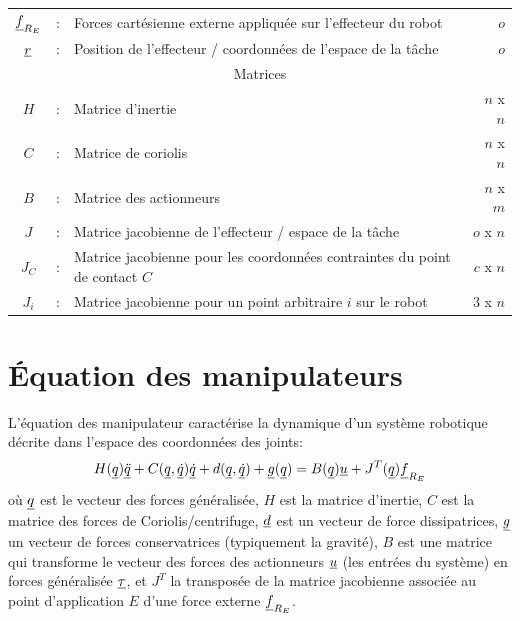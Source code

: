 \begin{table}[H]
\begin{tabular}{ c c l r }
			$\underline{f}_{R_E}$     &  :  & Forces cartésienne externe appliquée sur l'effecteur du robot                  & $o$  \\
			$\underline{r}$       &  :  & Position de l'effecteur / coordonnées de l'espace de la tâche                             & $o$  \\
			\hline \hline
			\multicolumn{4}{c}{Matrices} \\
			\hline \hline
			$H$             &  :  & Matrice d'inertie                                            & $n$ x $n$ \\
			$C$             &  :  & Matrice de coriolis                       & $n$ x $n$ \\
			$B$             &  :  & Matrice des actionneurs                                & $n$ x $m$ \\
			$J$             &  :  & Matrice jacobienne de l'effecteur / espace de la tâche & $o$ x $n$ \\
			$J_C$           &  :  & Matrice jacobienne pour les coordonnées contraintes du point de contact $C$                       & $c$ x $n$  \\
            $J_i$           &  :  & Matrice jacobienne pour un point arbitraire $i$ sur le robot                      & $3$ x $n$  \\
		\hline \hline
        \end{tabular}		
	\label{tab:nom}
\end{table}




\newpage
\section{Équation des manipulateurs}
\label{sec:manipeq}

L'équation des manipulateur caractérise la dynamique d'un système robotique décrite dans l'espace des coordonnées des joints:
\begin{align}
H(\underline{q}) \underline{\ddot{q}} + C(\underline{q},\underline{\dot{q}}) \underline{\dot{q}} + d(\underline{q}, \underline{\dot{q}}) + \underline{g}(\underline{q}) = B(\underline{q}) \underline{u}  + J^T(\underline{q}) \underline{f}_{R_E}
\label{eq:manipulator}
\end{align}
où $\underline{q}$ est le vecteur des forces généralisée, $H$ est la matrice d'inertie, $C$ est la matrice des forces de Coriolis/centrifuge, $\underline{d}$ est un vecteur de force dissipatrices, $\underline{g}$ un vecteur de forces conservatrices (typiquement la gravité), $B$ est une matrice qui transforme le vecteur des forces des actionneurs $\underline{u}$ (les entrées du système) en forces généralisée $\underline{\tau}$, et $J^T$ la transposée de la matrice jacobienne associée au point d'application $E$ d'une force externe $\underline{f}_{R_E}$.



